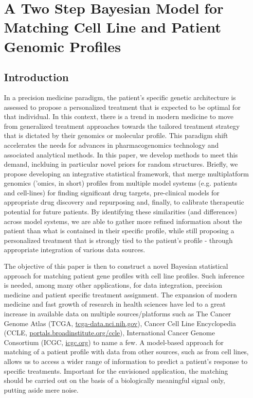 \chapter{A Two Step Bayesian Model for Matching Cell Line and Patient Genomic Profiles}
\label{ch:cell_line_patients}
%

\section{Introduction}
\label{sec:intro}

In a precision medicine paradigm, the patient's specific genetic architecture is assessed to propose a personalized treatment that is expected to be optimal for that individual. In this context, there is a trend in modern medicine to move from generalized treatment approaches towards the tailored treatment strategy that is dictated by their genomics or molecular profile. This paradigm shift accelerates the needs for advances in pharmacogenomics technology and associated analytical methods. In this paper, we develop methods to meet this demand, inclduing in particular novel priors for random structures. Briefly, we propose  developing an integrative statistical framework, that merge  multiplatform genomics ('omics, in short) profiles from multiple model systems (e.g. patients and cell-lines) for finding significant drug targets, pre-clinical models for appropriate drug discovery and repurposing  and, finally, to calibrate therapeutic potential for future patients. By identifying these similarities (and differences) across model systems, we are able to gather more refined information about the patient than what is contained in their specific profile, while still proposing a personalized treatment that is strongly tied to the patient's profile - through appropriate integration of various data sources. 

The objective of this paper is then to construct a novel Bayesian statistical  approach for  matching patient gene profiles with cell line profiles. Such inference is needed, among many other applications, for data integration, precision medicine and patient specific treatment assignment. The expansion of modern medicine and fast growth of research in health sciences  have  led to a great increase in available  data on multiple sources/platforms such as The Cancer Genome Atlas (TCGA, \url{tcga-data.nci.nih.gov}), Cancer Cell Line Encyclopedia (CCLE, \url{portals.broadinstitute.org/ccle}), International Cancer Genome Consortium (ICGC, \url{icgc.org}) to name a few.  A model-based approach  for matching of a patient profile with data from other sources, such as from cell lines, allows us to access a  wider range of information to predict a patient’s response to specific treatments. Important for the envisioned application, the matching should be carried out on the basis of a biologically meaningful signal only, putting aside mere noise.

